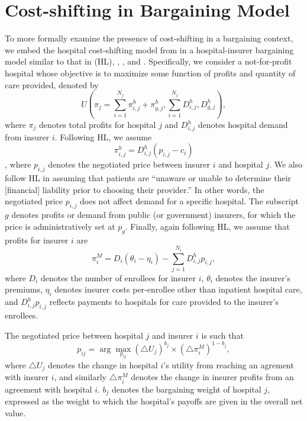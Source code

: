 \documentclass[12pt]{article}
\begin{document}
\newpage
\section{Cost-shifting in Bargaining Model}
\label{app:cs_bargaining}
To more formally examine the presence of cost-shifting in a bargaining context, we embed the hospital cost-shifting model from \cite{dranove1988} in a hospital-insurer bargaining model similar to that in \cite{ho2016} (HL), \cite{gowrisankaran2015}, \cite{lewis2015}, and \cite{dor2004}. Specifically, we consider a not-for-profit hospital whose objective is to maximize some function of profits and quantity of care provided, denoted by
\begin{equation}
 U\left( \pi_{j} = \sum_{i=1}^{N_{j}} \pi_{i,j}^{h} + \pi_{g,j}^{h}, \sum_{i=1}^{N_{j}} D_{i,j}^{h}, D_{g,j}^{h} \right),
\label{eqn:nfp_objective}
\end{equation}
where $\pi_{j}$ denotes total profits for hospital $j$ and $D_{i,j}^{h}$ denotes hospital demand from insurer $i$. Following HL, we assume $$\pi_{i,j}^{h}=D_{i,j}^{h}(p_{i,j}-c_{i})$$, where $p_{i,j}$ denotes the negotiated price between insurer $i$ and hospital $j$. We also follow HL in assuming that patients are ``unaware or unable to determine their [financial] liability prior to choosing their provider.'' In other words, the negotiated price $p_{i,j}$ does not affect demand for a specific hospital. The subscript $g$ denotes profits or demand from public (or government) insurers, for which the price is administratively set at $p_{g}$. Finally, again following HL, we assume that profits for insurer $i$ are
\begin{equation}
\pi_{i}^{M} = D_{i} \left( \theta_{i} - \eta_{i} \right) - \sum_{j=1}^{N_{i}} D_{i,j}^{h} p_{i,j},
\label{eqn:ins_profit}
\end{equation}
where $D_{i}$ denotes the number of enrollees for insurer $i$, $\theta_{i}$ denotes the insurer's premiums, $\eta_{i}$ denotes insurer costs per-enrollee other than inpatient hospital care, and $D_{i,j}^{h} p_{i,j}$ reflects payments to hospitals for care provided to the insurer's enrollees.

The negotiated price between hospital $j$ and insurer $i$ is such that
\begin{equation}
 p_{ij}= \arg \max_{p_{ij}} \left(\triangle U_{j} \right)^{b_{j}} \times \left(\triangle \pi^{M}_{i} \right)^{1-b_{j}},
 \label{eqn:neg_price}
\end{equation}
where $\triangle U_{j}$ denotes the change in hospital $i$'s utility from reaching an agrement with insurer $i$, and similarly $\triangle \pi^{M}_{i}$ denotes the change in insurer profits from an agreement with hospital $i$. $b_{j}$ denotes the bargaining weight of hospital $j$, expressed as the weight to which the hospital's payoffs are given in the overall net value.
\end{document}
